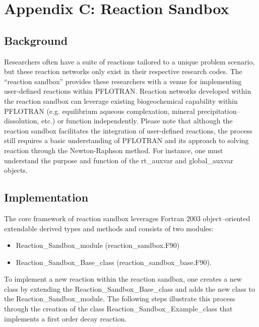 \section*{Appendix C: Reaction Sandbox}


\setcounter{section}{3}
\setcounter{subsection}{0}
\setcounter{equation}{0}
\setcounter{table}{0}
\setcounter{figure}{0}

\subsection{Background}

Researchers often have a suite of reactions tailored to a unique problem scenario, but these reaction networks only exist in their respective research codes. The ``reaction sandbox'' provides these researchers with a venue for implementing user-defined reactions within PFLOTRAN. Reaction networks developed within the reaction sandbox can leverage existing biogeochemical capability within PFLOTRAN (e.g. equilibrium aqueous complexation, mineral precipitation--dissolution, etc.) or function independently. Please note that although the reaction sandbox facilitates the integration of user-defined reactions, the process still requires a basic understanding of PFLOTRAN and its approach to solving reaction through the Newton-Raphson method. For instance, one must understand the purpose and function of the rt\_auxvar and global\_auxvar objects.

\subsection{Implementation}
The core framework of reaction sandbox leverages Fortran 2003 object--oriented extendable derived types and methods and consists of two modules:

\begin{itemize}
  \item[] Reaction\_Sandbox\_module (reaction\_sandbox.F90)
  \item[] Reaction\_Sandbox\_Base\_class (reaction\_sandbox\_base.F90).
\end{itemize}

To implement a new reaction within the reaction sandbox, one creates a new class by extending the Reaction\_Sandbox\_Base\_class and adds the new class to the Reaction\_Sandbox\_module.  The following steps illustrate this process through the creation of the class Reaction\_Sandbox\_Example\_class that implements a first order decay reaction.

